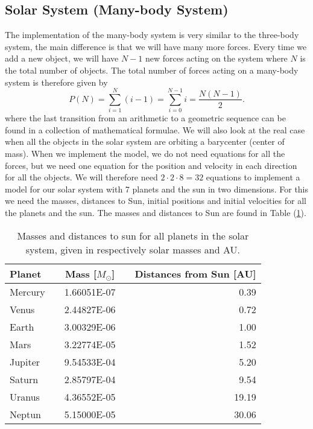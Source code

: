 \documentclass[norsk,a4paper,12pt]{article}
\begin{document}
\subsection{Solar System (Many-body System)}
The implementation of the many-body system is very similar to the three-body system, the main difference is that we will have many more forces. Every time we add a new object, we will have $N-1$ new forces acting on the system where $N$ is the total number of objects. The total number of forces acting on a many-body system is therefore given by
\begin{equation}
P(N)=\sum_{i=1}^N(i-1)=\sum_{i=0}^{N-1}i=\frac{N(N-1)}{2}.
\end{equation}
where the last transition from an arithmetic to a geometric sequence can be found in a collection of mathematical formulae.  We will also look at the real case when all the objects in the solar system are orbiting a barycenter (center of mass). When we implement the model, we do not need equations for all the forces, but we need one equation for the position and velocity in each direction for all the objects. We will therefore need $2\cdot2\cdot8=32$ equations to implement a model for our solar system with 7 planets and the sun in two dimensions. For this we need the masses, distances to Sun, initial positions and initial velocities for all the planets and the sun. The masses and distances to Sun are found in Table (\ref{tab:Masses}).
\begin{table}[H]
\centering
\caption{Masses and distances to sun for all planets in the solar system, given in respectively solar masses and AU.}
\label{tab:Masses}
\begin{tabular}{lcccr}
\hline
Planet  &   & Mass [$M_\odot$] &    & Distances from Sun [AU] \\
\hline
Mercury 	&	& 1.66051E-07  &    & 0.39    \\
Venus   &   & 2.44827E-06  &    & 0.72    \\
Earth   &   & 3.00329E-06  &    & 1.00    \\
Mars    &   & 3.22774E-05  &    & 1.52    \\
Jupiter &   & 9.54533E-04  &    & 5.20    \\
Saturn 	&	& 2.85797E-04  &    & 9.54    \\
Uranus 	&	& 4.36552E-05  &    & 19.19   \\
Neptun  &	& 5.15000E-05  &    & 30.06   \\
\hline
\end{tabular}
\end{table}
\end{document}
